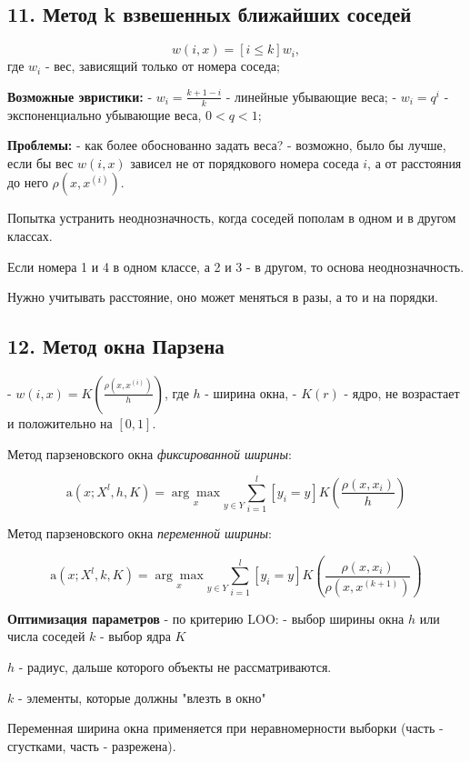 \subsection{11. Метод k взвешенных ближайших соседей}

$$w(i,x) = [i \leqslant k]w_i,$$
где $w_i$ - вес, зависящий только от номера соседа;

\textbf{Возможные эвристики:}
- $w_i = \frac{k+1-i}{k}$ - линейные убывающие веса;
- $w_i = q^i$ - экспоненциально убывающие веса, $0 < q < 1$;

\textbf{Проблемы:}
- как более обоснованно задать веса?
- возможно, было бы лучше, если бы вес $w(i,x)$ зависел не от порядкового
номера соседа $i$, а от расстояния до него $\rho (x, x^{(i)})$.

Попытка устранить неоднозначность, когда соседей пополам в одном и в другом
классах.

Если номера 1 и 4 в одном классе, а 2 и 3 - в другом, то основа
неоднозначность.

Нужно учитывать расстояние, оно может меняться в разы, а то и на порядки.

\subsection{12. Метод окна Парзена}

- $\displaystyle w(i,x) = K{\left(\frac{\rho(x, x^{(i)})}{h}\right)}$, где
$h$ - ширина окна,
- $K(r)$ - ядро, не возрастает и положительно на $[0,1]$.

Метод парзеновского окна \textit{фиксированной ширины}:

$$\text{a}(x; X^l, h, K) = {\underset{x}{\arg\max}}_{y \in Y}{\sum^l_{i=1}{[y_i = y] K
\left( \frac{\rho(x, x_i)}{h} \right)}}$$

Метод парзеновского окна \textit{переменной ширины}:

$$\text{a}(x; X^l, k, K) = {\underset{x}{\arg\max}}_{y \in Y}{\sum^l_{i=1}{[y_i = y] K
\left( \frac{\rho(x, x_i)}{\rho{(x, x^{(k+1)})}} \right)}}$$

\textbf{Оптимизация параметров} - по критерию LOO:
- выбор ширины окна $h$ или числа соседей $k$
- выбор ядра $K$

$h$ - радиус, дальше которого объекты не рассматриваются.

$k$ - элементы, которые должны "влезть в окно"

Переменная ширина окна применяется при неравномерности выборки
(часть - сгустками, часть - разрежена).

